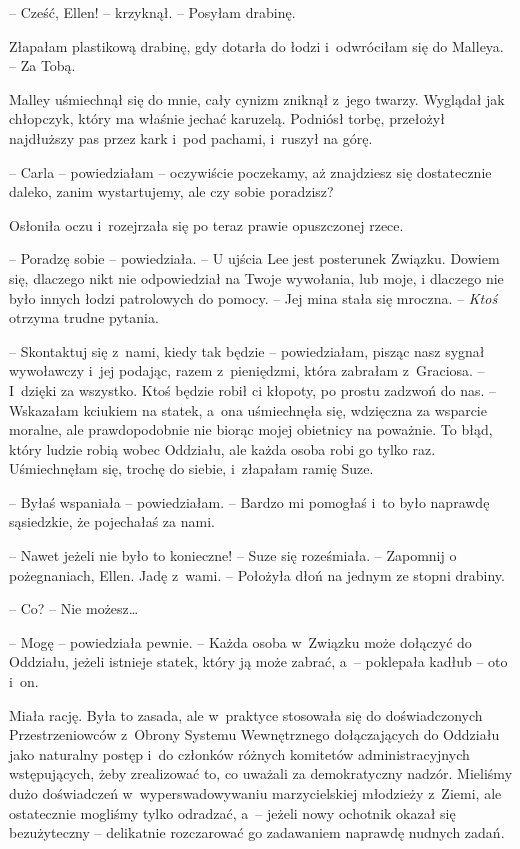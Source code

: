 \documentclass[oneside,polish,11pt,sfheadings]{mwbk}
\begin{document}
-- Cześć, Ellen! -- krzyknął. -- Posyłam drabinę.

Złapałam plastikową drabinę, gdy dotarła do łodzi i~odwróciłam się do
Malleya. -- Za Tobą.

Malley uśmiechnął się do mnie, cały cynizm zniknął z~jego twarzy.
Wyglądał jak chłopczyk, który ma właśnie jechać karuzelą. Podniósł
torbę, przełożył najdłuższy pas przez kark i~pod pachami, i~ruszył na
górę.

-- Carla -- powiedziałam -- oczywiście poczekamy, aż znajdziesz się
dostatecznie daleko, zanim wystartujemy, ale czy sobie poradzisz?

Osłoniła oczu i~rozejrzała się po teraz prawie opuszczonej rzece. 

-- Poradzę sobie -- powiedziała. -- U ujścia Lee jest posterunek Związku.
Dowiem się, dlaczego nikt nie odpowiedział na Twoje wywołania, lub moje,
i dlaczego nie było innych łodzi patrolowych do pomocy. -- Jej mina stała
się mroczna. -- \textit{Ktoś} otrzyma trudne pytania.

-- Skontaktuj się z~nami, kiedy tak będzie -- powiedziałam, pisząc nasz
sygnał wywoławczy i~jej podając, razem z~pieniędzmi, która zabrałam z~Graciosa. -- I~dzięki za wszystko. Ktoś będzie robił ci kłopoty, po
prostu zadzwoń do nas. -- Wskazałam kciukiem na statek, a~ona uśmiechnęła
się, wdzięczna za wsparcie moralne, ale prawdopodobnie nie biorąc mojej
obietnicy na poważnie. To błąd, który ludzie robią wobec Oddziału, ale
każda osoba robi go tylko raz. Uśmiechnęłam się, trochę do siebie, i~złapałam ramię Suze.

-- Byłaś wspaniała -- powiedziałam. -- Bardzo mi pomogłaś i~to było
naprawdę sąsiedzkie, że pojechałaś za nami.

-- Nawet jeżeli nie było to konieczne! -- Suze się roześmiała. -- Zapomnij
o pożegnaniach, Ellen. Jadę z~wami. -- Położyła dłoń na jednym ze stopni
drabiny.

-- Co? -- Nie możesz\ldots 

-- Mogę -- powiedziała pewnie. -- Każda osoba w~Związku może dołączyć do
Oddziału, jeżeli istnieje statek, który ją może zabrać, a~-- poklepała
kadłub -- oto i~on.

Miała rację. Była to zasada, ale w~praktyce stosowała się do
doświadczonych Przestrzeniowców z~Obrony Systemu Wewnętrznego
dołączających do Oddziału jako naturalny postęp i~do członków różnych
komitetów administracyjnych wstępujących, żeby zrealizować to, co
uważali za demokratyczny nadzór. Mieliśmy dużo doświadczeń w~wyperswadowywaniu marzycielskiej młodzieży z~Ziemi, ale ostatecznie
mogliśmy tylko odradzać, a~-- jeżeli nowy ochotnik okazał się
bezużyteczny -- delikatnie rozczarować go zadawaniem naprawdę nudnych
zadań.
\end{document}
